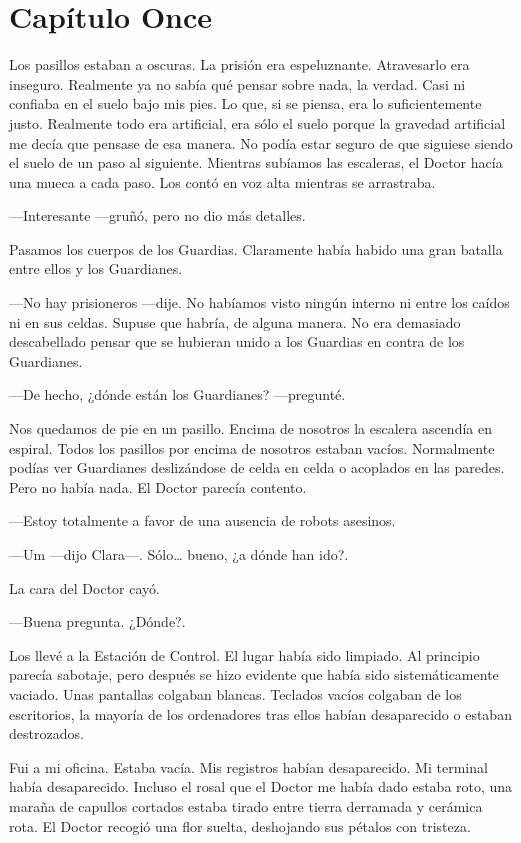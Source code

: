 \chapter*{Capítulo Once}

Los pasillos estaban a oscuras. La prisión era espeluznante. Atravesarlo
era inseguro. Realmente ya no sabía qué pensar sobre nada, la verdad.
Casi ni confiaba en el suelo bajo mis pies. Lo que, si se piensa, era lo
suficientemente justo. Realmente todo era artificial, era sólo el suelo
porque la gravedad artificial me decía que pensase de esa manera. No
podía estar seguro de que siguiese siendo el suelo de un paso al
siguiente. Mientras subíamos las escaleras, el Doctor hacía una mueca a
cada paso. Los contó en voz alta mientras se arrastraba.

---Interesante ---gruñó, pero no dio más detalles.

Pasamos los cuerpos de los Guardias. Claramente había habido una gran
batalla entre ellos y los Guardianes.

---No hay prisioneros ---dije. No habíamos visto ningún interno ni entre
los caídos ni en sus celdas. Supuse que habría, de alguna manera. No era
demasiado descabellado pensar que se hubieran unido a los Guardias en
contra de los Guardianes.

---De hecho, ¿dónde están los Guardianes? ---pregunté.

Nos quedamos de pie en un pasillo. Encima de nosotros la escalera
ascendía en espiral. Todos los pasillos por encima de nosotros estaban
vacíos. Normalmente podías ver Guardianes deslizándose de celda en celda
o acoplados en las paredes. Pero no había nada. El Doctor parecía
contento.

---Estoy totalmente a favor de una ausencia de robots asesinos.

---Um ---dijo Clara---. Sólo\ldots{} bueno, ¿a dónde han ido?.

La cara del Doctor cayó.

---Buena pregunta. ¿Dónde?.

Los llevé a la Estación de Control. El lugar había sido limpiado. Al
principio parecía sabotaje, pero después se hizo evidente que había sido
sistemáticamente vaciado. Unas pantallas colgaban blancas. Teclados
vacíos colgaban de los escritorios, la mayoría de los ordenadores tras
ellos habían desaparecido o estaban destrozados.

Fui a mi oficina. Estaba vacía. Mis registros habían desaparecido. Mi
terminal había desaparecido. Incluso el rosal que el Doctor me había
dado estaba roto, una maraña de capullos cortados estaba tirado entre
tierra derramada y cerámica rota. El Doctor recogió una flor suelta,
deshojando sus pétalos con tristeza.


